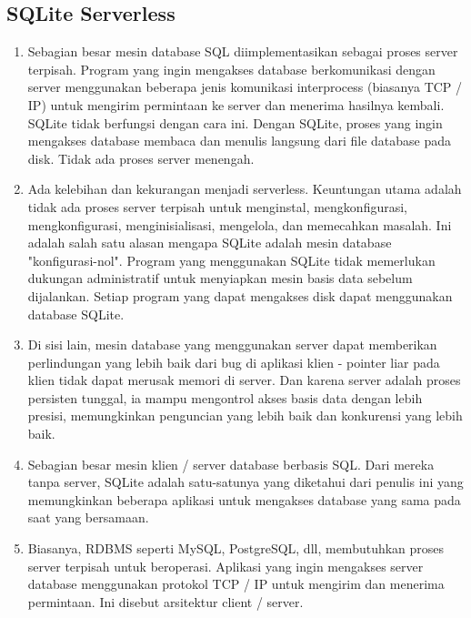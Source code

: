 	\subsection{SQLite Serverless}
		\begin{enumerate}
			\item Sebagian besar mesin database SQL diimplementasikan sebagai proses server terpisah. Program yang ingin mengakses database berkomunikasi dengan server menggunakan beberapa jenis komunikasi interprocess (biasanya TCP / IP) untuk mengirim permintaan ke server dan menerima hasilnya kembali. SQLite tidak berfungsi dengan cara ini. Dengan SQLite, proses yang ingin mengakses database membaca dan menulis langsung dari file database pada disk. Tidak ada proses server menengah.
			\item Ada kelebihan dan kekurangan menjadi serverless. Keuntungan utama adalah tidak ada proses server terpisah untuk menginstal, mengkonfigurasi, mengkonfigurasi, menginisialisasi, mengelola, dan memecahkan masalah. Ini adalah salah satu alasan mengapa SQLite adalah mesin database "konfigurasi-nol". Program yang menggunakan SQLite tidak memerlukan dukungan administratif untuk menyiapkan mesin basis data sebelum dijalankan. Setiap program yang dapat mengakses disk dapat menggunakan database SQLite.
			\item Di sisi lain, mesin database yang menggunakan server dapat memberikan perlindungan yang lebih baik dari bug di aplikasi klien - pointer liar pada klien tidak dapat merusak memori di server. Dan karena server adalah proses persisten tunggal, ia mampu mengontrol akses basis data dengan lebih presisi, memungkinkan penguncian yang lebih baik dan konkurensi yang lebih baik.
			\item Sebagian besar mesin klien / server database berbasis SQL. Dari mereka tanpa server, SQLite adalah satu-satunya yang diketahui dari penulis ini yang memungkinkan beberapa aplikasi untuk mengakses database yang sama pada saat yang bersamaan.
			\item Biasanya, RDBMS seperti MySQL, PostgreSQL, dll, membutuhkan proses server terpisah untuk beroperasi. Aplikasi yang ingin mengakses server database menggunakan protokol TCP / IP untuk mengirim dan menerima permintaan. Ini disebut arsitektur client / server.
		\end{enumerate}
